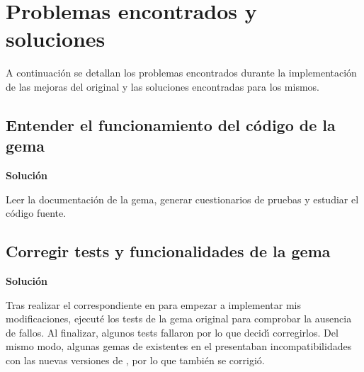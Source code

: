 \section{Problemas encontrados y soluciones}
\label{3:sec:1}

A continuaci\'on se detallan los problemas encontrados durante la implementaci\'on de las mejoras del  original y las soluciones
encontradas para los mismos.

\subsection{Entender el funcionamiento del c\'odigo de la gema}
\label{subsec:3.1.1}
\bigskip

{\normalsize {\bfseries Soluci\'on}}
\bigskip

Leer la documentaci\'on de la gema, generar cuestionarios de pruebas y estudiar el c\'odigo fuente.

\subsection{Corregir tests y funcionalidades de la gema}
\label{subsec:3.1.2}
\bigskip

{\normalsize {\bfseries Soluci\'on}}
\bigskip

Tras realizar el correspondiente \cei{\ref{apend1:fork}} en  para empezar a implementar mis modificaciones, ejecut\'e los tests de la 
gema original para comprobar la ausencia de fallos. Al finalizar, algunos tests fallaron por lo que decid\'{\i} corregirlos. Del 
mismo modo, algunas gemas de  existentes en el \ceit{\ref{apend1:gemfile}} presentaban incompatibilidades con las nuevas versiones de , por
lo que tambi\'en se corrigi\'o.
\bigskip
